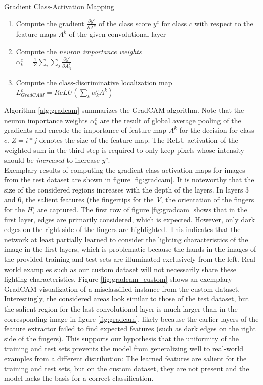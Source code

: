 \documentclass[a4paper]{article}
\begin{document}
\begin{algorithm}
     \caption{Gradient Class-Activation Mapping}
     \label{alg:gradcam}
     \begin{enumerate}
          \item Compute the gradient $\frac{\partial y^c}{\partial A^k}$ of the class score $y^c$ for class $c$ with respect to the feature maps $A^k$ of the given convolutional layer
          \item Compute the \textit{neuron importance weights}\\ $\alpha^c_k = \frac{1}{Z} \sum_i \sum_j \frac{\partial y^c}{\partial A^k_{ij}}$
          \item Compute the class-discriminative localization map\\
          $L^c_{GradCAM} = ReLU(\sum_k \alpha_k^c A^k)$
     \end{enumerate}
\end{algorithm}
Algorithm \ref{alg:gradcam} summarizes the GradCAM algorithm. Note that the neuron importance weights $\alpha_k^c$ are the result of global average pooling of the gradients and encode the importance of feature map $A^k$ for the decision for class $c$. $Z = i*j$ denotes the size of the feature map. The ReLU activation of the weighted sum in the third step is required to only keep pixels whose intensity should be \textit{increased} to increase $y^c$.\\
Exemplary results of computing the gradient class-activation maps for images from the test dataset are shown in figure \ref{fig:gradcam}. It is noteworthy that the size of the considered regions increases with the depth of the layers. In layers 3 and 6, the salient features (the fingertips for the \textit{V}, the orientation of the fingers for the \textit{H}) are captured. The first row of figure \ref{fig:gradcam} shows that in the first layer, edges are primarily considered, which is expected. However, only dark edges on the right side of the fingers are highlighted. This indicates that the network at least partially learned to consider the lighting characteristics of the image in the first layers, which is problematic because the hands in the images of the provided training and test sets are illuminated exclusively from the left. Real-world examples such as our custom dataset will not necessarily share these lighting characteristics. Figure \ref{fig:gradcam_custom} shows an exemplary GradCAM visualization of a misclassified instance from the custom dataset. Interestingly, the considered areas look similar to those of the test dataset, but the salient region for the last convolutional layer is much larger than in the corresponding image in figure \ref{fig:gradcam}, likely because the earlier layers of the feature extractor failed to find expected features (such as dark edges on the right side of the fingers). This supports our hypothesis that the uniformity of the training and test sets prevents the model from generalizing well to real-world examples from a different distribution: The learned features are salient for the training and test sets, but on the custom dataset, they are not present and the model lacks the basis for a correct classification.
\end{document}
